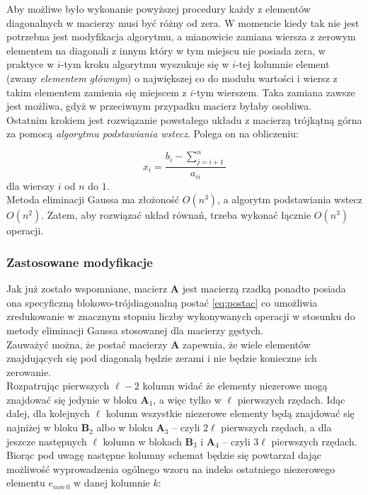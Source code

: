 \documentclass{mk-polish-lab-report}
\newcommand{\mA}{\bm{A}}
\newcommand{\mB}{\bm{B}}
\begin{document}
\noindent Aby możliwe było wykonanie powyższej procedury każdy z elementów diagonalnych w macierzy musi być różny od zera. W momencie kiedy tak nie jest potrzebna jest modyfikacja algorytmu, a mianowicie zamiana wiersza z zerowym elementem na diagonali z innym który w tym miejscu nie posiada zera, w praktyce w $i$-tym kroku algorytmu wyszukuje się w $i$-tej kolumnie element (zwany \emph{elementem głównym}) o największej co do modułu wartości i wiersz z takim elementem zamienia się miejscem z $i$-tym wierszem. Taka zamiana zawsze jest możliwa, gdyż w przeciwnym przypadku macierz byłaby osobliwa. \\

\noindent Ostatnim krokiem jest rozwiązanie powstałego układu z macierzą trójkątną górna za pomocą \emph{algorytmu podstawiania wstecz}. Polega on na obliczeniu:

\begin{equation*}
x_i = \frac{b_i - \sum_{j = i+1}^n}{a_{ii}}
\end{equation*}
dla wierszy $i$ od $n$ do $1$.  \\

\noindent Metoda eliminacji Gaussa ma złożoność $O(n^3)$, a algorytm podstawiania wstecz $O(n^2)$. Zatem, aby rozwiązać układ równań, trzeba wykonać łącznie $O(n^3)$ operacji.

\subsubsection{Zastosowane modyfikacje}

Jak już zostało wspomniane, macierz $\mA$ jest macierzą rzadką ponadto posiada ona specyficzną blokowo-trójdiagonalną postać \eqref{eq:postac} co umożliwia zredukowanie w znacznym stopniu liczby wykonywanych operacji w stosunku do metody eliminacji Gaussa stosowanej dla macierzy gęstych. \\

\noindent Zauważyć można, że postać macierzy $\mA$ zapewnia, że wiele elementów znajdujących się pod diagonalą będzie zerami i nie będzie konieczne ich zerowanie. \\

\noindent Rozpatrując pierwszych $\ell-2$ kolumn widać że elementy niezerowe mogą znajdować się jedynie w bloku $\mA_1$, a więc tylko w $\ell$ pierwszych rzędach. Idąc dalej, dla kolejnych $\ell$ kolumn wszystkie niezerowe elementy będą znajdować się najniżej w bloku $\mB_2$ albo w bloku $\mA_3$ -- czyli $2\ell$ pierwszych rzędach, a dla jeszcze następnych $\ell$ kolumn w blokach $\mB_3$ i $\mA_4$ -- czyli $3\ell$ pierwszych rzędach. Biorąc pod uwagę następne kolumny schemat będzie się powtarzał dając możliwość wyprowadzenia ogólnego wzoru na indeks ostatniego niezerowego elementu $e_{non~0}$ w danej kolumnie $k$:
\end{document}
